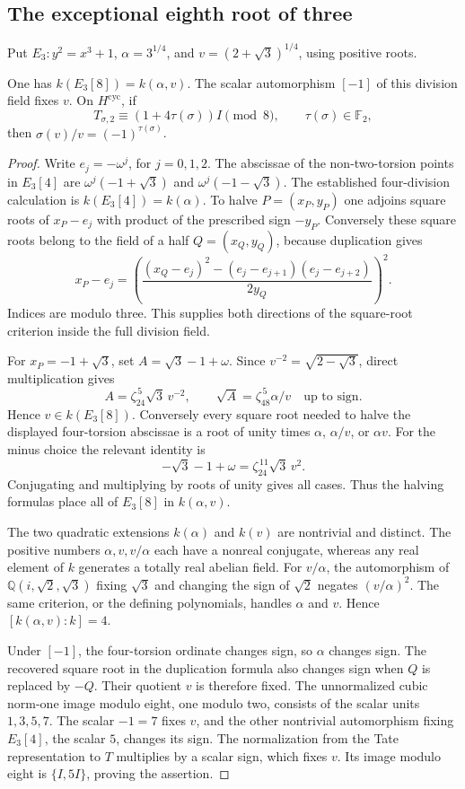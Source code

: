 \subsection{The exceptional eighth root of three}

Put $E_3:y^2=x^3+1$, $\alpha=3^{1/4}$, and
$v=(2+\sqrt3)^{1/4}$, using positive roots.

\begin{lemma}\label{lem:lr-cubic-eight-field}
One has $k(E_3[8])=k(\alpha,v)$.
The scalar automorphism $[-1]$ of this division field fixes $v$.
On $H^{\mathrm{cyc}}$, if
\[
 T_{\sigma,2}\equiv(1+4\tau(\sigma))I\pmod8,
 \qquad \tau(\sigma)\in\mathbb F_2,
\]
then $\sigma(v)/v=(-1)^{\tau(\sigma)}$.
\end{lemma}
\begin{proof}
Write $e_j=-\omega^j$, for $j=0,1,2$.
The abscissae of the non-two-torsion points in $E_3[4]$ are
$\omega^j(-1+\sqrt3)$ and $\omega^j(-1-\sqrt3)$.
The established four-division calculation is
$k(E_3[4])=k(\alpha)$.
To halve $P=(x_P,y_P)$ one adjoins square roots of $x_P-e_j$
with product of the prescribed sign $-y_P$.
Conversely these square roots belong to the field of a half
$Q=(x_Q,y_Q)$, because duplication gives
\[
 x_P-e_j=
 \left(\frac{(x_Q-e_j)^2-(e_j-e_{j+1})(e_j-e_{j+2})}
 {2y_Q}\right)^2.
\]
Indices are modulo three. This supplies both directions of
the square-root criterion inside the full division field.

For $x_P=-1+\sqrt3$, set $A=\sqrt3-1+\omega$.
Since $v^{-2}=\sqrt{2-\sqrt3}$, direct multiplication gives
\[
 A=\zeta_{24}^{\,5}\sqrt3\,v^{-2},\qquad
 \sqrt A=\zeta_{48}^{\,5}\alpha/v
 \quad\text{up to sign}.
\]
Hence $v\in k(E_3[8])$.
Conversely every square root needed to halve the displayed
four-torsion abscissae is a root of unity times
$\alpha$, $\alpha/v$, or $\alpha v$.
For the minus choice the relevant identity is
\[
 -\sqrt3-1+\omega=\zeta_{24}^{\,11}\sqrt3\,v^2.
\]
Conjugating and multiplying by roots of unity gives all cases.
Thus the halving formulas place all of $E_3[8]$ in $k(\alpha,v)$.

The two quadratic extensions $k(\alpha)$ and $k(v)$ are
nontrivial and distinct. The positive numbers $\alpha,v,v/\alpha$
each have a nonreal conjugate, whereas any real element of
$k$ generates a totally real abelian field.
For $v/\alpha$, the automorphism of
$\mathbb Q(i,\sqrt2,\sqrt3)$ fixing $\sqrt3$ and changing
the sign of $\sqrt2$ negates $(v/\alpha)^2$.
The same criterion, or the defining polynomials, handles
$\alpha$ and $v$. Hence $[k(\alpha,v):k]=4$.

Under $[-1]$, the four-torsion ordinate changes sign,
so $\alpha$ changes sign. The recovered square root in
the duplication formula also changes sign when $Q$ is
replaced by $-Q$. Their quotient $v$ is therefore fixed.
The unnormalized cubic norm-one image modulo eight,
one modulo two, consists of the scalar units $1,3,5,7$.
The scalar $-1=7$ fixes $v$, and the other nontrivial
automorphism fixing $E_3[4]$, the scalar $5$, changes its sign.
The normalization from the Tate representation to $T$
multiplies by a scalar sign, which fixes $v$.
Its image modulo eight is $\{I,5I\}$, proving the assertion.
\end{proof}

